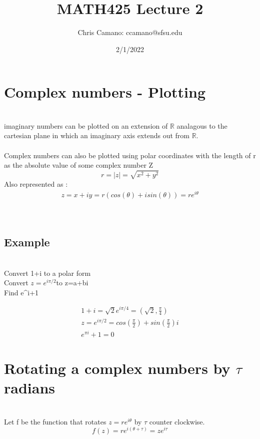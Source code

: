 \documentclass[12pt,a4paper]{article}
\author{Chris Camano: ccamano@sfsu.edu}
\title{MATH425 Lecture 2 }
\date{2/1/2022}
\begin{document}
\maketitle

\section{Complex numbers - Plotting}\\
imaginary numbers can be plotted on an extension of $\mathbb{R}$ analagous to the cartesian plane in which an imaginary axis extends out from $\mathbb{R}$. \\\\
Complex numbers can also be plotted using polar coordinates with the length of r as the absolute value of some complex number Z\\
\[
  r=|z|=\sqrt{x^2+y^2}
\]
Also represented as :
\begin{align*}
  z=x+iy=r(cos(\theta)+isin(\theta))=re^{i\theta}
\end{align*}
\\\\
\subsection{Example}\\
Convert 1+i to a polar form\\
Convert $z=e^{i\pi/2}$to z=a+bi\\
Find e^{\pi i}+1

\begin{align*}
  1+i=\sqrt{2}e^{i\pi /4}=(\sqrt{2},\frac{\pi}{4})\\
  z=e^{i\pi/2}=cos(\frac{\pi}{2})+sin(\frac{\pi}{2})i\\
  e^{\pi i}+1=0
\end{align*}
\section{Rotating a complex numbers by $\tau$ radians}\\
Let f be the function that rotates $z=re^{i\theta}$ by $\tau$ counter clockwise. \\
\[
  f(z)= re^{i(\theta+\tau)}=ze^{i\tau}
\]
\end{document}
